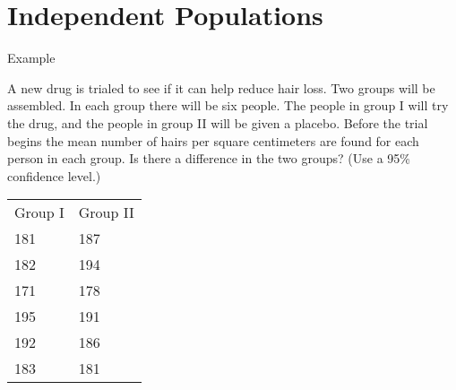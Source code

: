 



\section{Independent Populations}


\begin{frame}{Example}


    A new drug is trialed to see if it can help reduce hair loss. Two
    groups will be assembled. In each group there will be six people.
    The people in group I will try the drug, and the people in group
    II will be given a placebo. Before the trial begins the mean number of
    hairs per square centimeters are found for each person in each
    group. Is there a difference in the two groups? (Use a 95\% confidence
    level.)

    \begin{tabular}{ll}
      Group I & Group II \\
      181 & 187 \\
      182 & 194 \\
      171 & 178 \\
      195 & 191 \\
      192 & 186 \\
      183 & 181
    \end{tabular}

    \vfill 


    \vfill


\end{frame}



